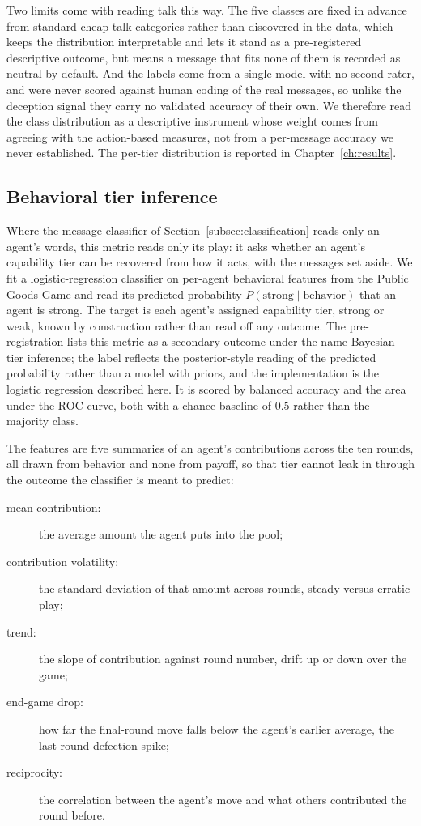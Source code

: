 Two limits come with reading talk this way. The five classes are fixed in advance
from standard cheap-talk categories rather than discovered in the
data, which keeps the distribution interpretable and lets it stand as a
pre-registered descriptive outcome, but means a message that fits none of them is
recorded as
neutral by default. And the labels come from a single model with no second rater,
and were never scored against human coding of the real messages, so unlike the
deception signal they carry no validated accuracy of their own. We therefore read
the class distribution as a descriptive instrument whose weight comes from
agreeing with the action-based measures, not from a per-message accuracy we never
established. The per-tier distribution is reported in Chapter~\ref{ch:results}.

\subsection{Behavioral tier inference}
\label{subsec:tier}

Where the message classifier of Section~\ref{subsec:classification} reads only an
agent's words, this metric reads only its play: it asks whether an agent's
capability tier can be recovered from how it acts, with the messages set aside. We
fit a logistic-regression classifier on per-agent behavioral features from the
Public Goods Game and read its predicted probability
$P(\mathrm{strong}\mid\mathrm{behavior})$ that an agent is strong. The target is
each agent's assigned capability tier, strong or weak, known by construction
rather than read off any outcome. The pre-registration lists this metric as a
secondary outcome under the name Bayesian tier inference; the label reflects the
posterior-style reading of the predicted probability rather than a model with
priors, and the implementation is the logistic regression described
here. It is scored by balanced accuracy and the area under the ROC curve, both
with a chance baseline of $0.5$ rather than the majority class.

The features are five summaries of an agent's contributions across the ten
rounds, all drawn from behavior and none from payoff, so that tier cannot leak in
through the outcome the classifier is meant to predict:
\begin{description}
  \item[mean contribution:] the average amount the agent puts into the pool;
  \item[contribution volatility:] the standard deviation of that amount across
    rounds, steady versus erratic play;
  \item[trend:] the slope of contribution against round number, drift up or down
    over the game;
  \item[end-game drop:] how far the final-round move falls below the agent's
    earlier average, the last-round defection spike;
  \item[reciprocity:] the correlation between the agent's move and what others
    contributed the round before.
\end{description}

